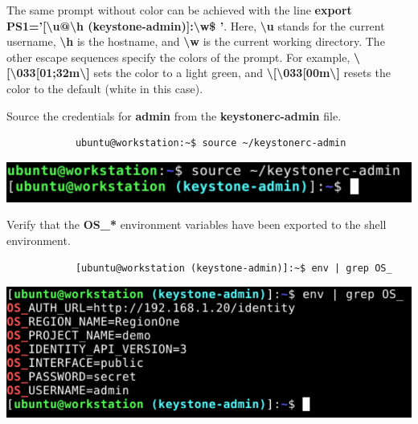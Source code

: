 \documentclass[letterpaper, 12pt]{article}
\begin{document}
\begin{enumerate}
    \begin{notebox}
        The same prompt without color can be achieved with the line \textbf{export PS1='[\textbackslash u@\textbackslash h (keystone-admin)]:\textbackslash w\$ '}.
        Here, \textbf{\textbackslash u} stands for the current username, \textbf{\textbackslash h} is the hostname, and \textbf{\textbackslash w} is the current working directory.
        The other escape sequences specify the colors of the prompt.
        For example, \textbf{\textbackslash[\textbackslash 033[01;32m\textbackslash]} sets the color to a light green, and \textbf{\textbackslash[\textbackslash 033[00m\textbackslash]} resets the color to the default (white in this case).
    \end{notebox}

    \begin{labstep}
        Source the credentials for \textbf{admin} from the \textbf{keystonerc-admin} file.
        \begin{lstlisting}
            ubuntu@workstation:~$ source ~/keystonerc-admin
        \end{lstlisting}

        \begin{center}
            \includegraphics[width=\linewidth]{images/part4/step3.png}
        \end{center}
    \end{labstep}

    \begin{labstep}
        Verify that the \textbf{OS\_*} environment variables have been exported to the shell environment.
        \begin{lstlisting}
            [ubuntu@workstation (keystone-admin)]:~$ env | grep OS_
        \end{lstlisting}

        \begin{center}
            \includegraphics[width=\linewidth]{images/part4/step4.png}
        \end{center}
    \end{labstep}


\end{enumerate}
\end{document}
